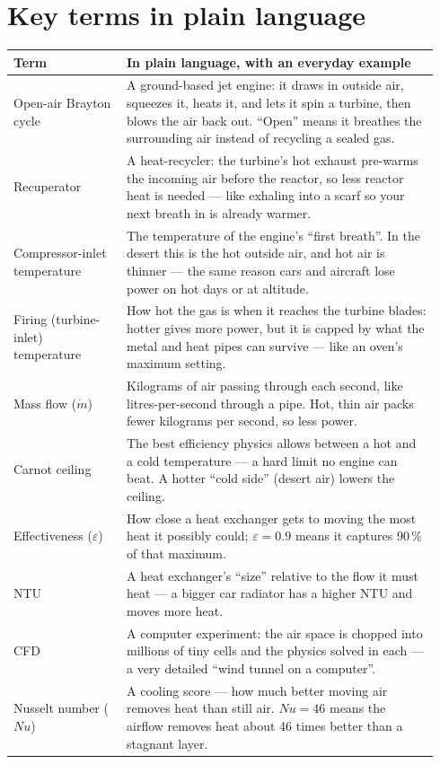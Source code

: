 \documentclass[11pt]{article}
\begin{document}
\section{Key terms in plain language}
{\small\renewcommand{\arraystretch}{1.3}
\noindent\begin{tabular}{@{}p{0.25\linewidth}p{0.69\linewidth}@{}}
\toprule
\textbf{Term} & \textbf{In plain language, with an everyday example}\\
\midrule
Open-air Brayton cycle & A ground-based jet engine: it draws in outside air, squeezes it, heats it, and lets it spin a turbine, then blows the air back out. ``Open'' means it breathes the surrounding air instead of recycling a sealed gas.\\
Recuperator & A heat-recycler: the turbine's hot exhaust pre-warms the incoming air before the reactor, so less reactor heat is needed --- like exhaling into a scarf so your next breath in is already warmer.\\
Compressor-inlet temperature & The temperature of the engine's ``first breath''. In the desert this is the hot outside air, and hot air is thinner --- the same reason cars and aircraft lose power on hot days or at altitude.\\
Firing (turbine-inlet) temperature & How hot the gas is when it reaches the turbine blades: hotter gives more power, but it is capped by what the metal and heat pipes can survive --- like an oven's maximum setting.\\
Mass flow ($\dot m$) & Kilograms of air passing through each second, like litres-per-second through a pipe. Hot, thin air packs fewer kilograms per second, so less power.\\
Carnot ceiling & The best efficiency physics allows between a hot and a cold temperature --- a hard limit no engine can beat. A hotter ``cold side'' (desert air) lowers the ceiling.\\
Effectiveness ($\varepsilon$) & How close a heat exchanger gets to moving the most heat it possibly could; $\varepsilon=0.9$ means it captures 90\,\% of that maximum.\\
NTU & A heat exchanger's ``size'' relative to the flow it must heat --- a bigger car radiator has a higher NTU and moves more heat.\\
CFD & A computer experiment: the air space is chopped into millions of tiny cells and the physics solved in each --- a very detailed ``wind tunnel on a computer''.\\
Nusselt number ($Nu$) & A cooling score --- how much better moving air removes heat than still air. $Nu=46$ means the airflow removes heat about 46 times better than a stagnant layer.\\

\end{tabular}}
\end{document}
